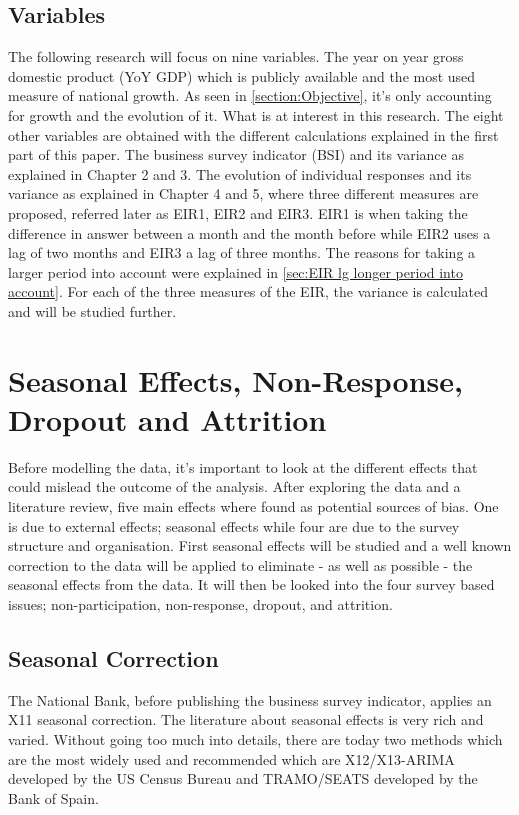 \documentclass[12pt,a4paper,oneside]{book}
\begin{document}
\section{Variables}

The following research will focus on nine variables. 
The year on year gross domestic product (YoY GDP) which is publicly available and the most used measure of national growth. As seen in \autoref{section:Objective}, it's only accounting for growth and the evolution of it. What is at interest in this research.
The eight other variables are obtained with the different calculations explained in the first part of this paper.
The business survey indicator (BSI) and its variance as explained in Chapter 2 and 3.
The evolution of individual responses and its variance as explained in Chapter 4 and 5, where three different measures are proposed, referred later as EIR1, EIR2 and EIR3. 
EIR1 is when taking the difference in answer between a month and the month before while EIR2 uses a lag of two months and EIR3 a lag of three months. The reasons for taking a larger period into account were explained in \autoref{sec:EIR lg longer period into account}.
For each of the three measures of the EIR, the variance is calculated and will be studied further.



\chapter{Seasonal Effects, Non-Response, Dropout and Attrition}
\label{chap:nonresponse dropout}

Before modelling the data, it's important to look at the different effects that could mislead the outcome of the analysis. After exploring the data and a literature review, five main effects where found as potential sources of bias. 
One is due to external effects; seasonal effects while four are due to the survey structure and organisation.
First seasonal effects will be studied and a well known correction to the data will be applied to eliminate - as well as possible - the seasonal effects from the data.
It will then be looked into the four survey based issues; non-participation, non-response, dropout, and attrition.


\section{Seasonal Correction}
\label{sec:seasonal correction}

The National Bank, before publishing the business survey indicator, applies an X11 seasonal correction.
The literature about seasonal effects is very rich and varied. Without going too much into details, there are today two methods which are the most widely used and recommended which are X12/X13-ARIMA developed by the US Census Bureau and TRAMO/SEATS developed by the Bank of Spain. 
\end{document}
